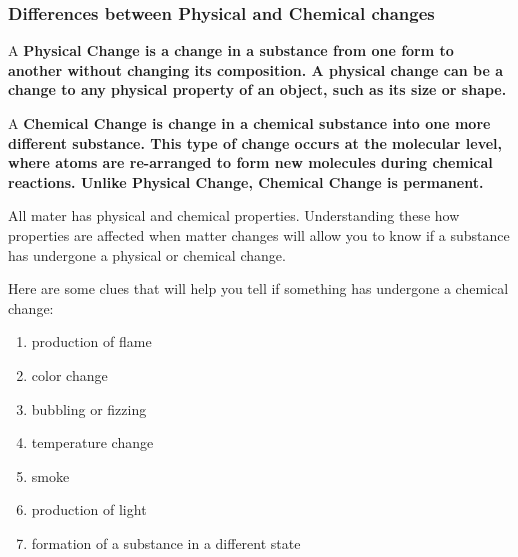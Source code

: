 
\subsubsection*{Differences between Physical and Chemical changes}

\begin{definition}
    A \bf{Physical Change} is a change in a substance from one form to
    another without changing its composition. A physical change can be a change
    to any physical property of an object, such as its size or shape.
\end{definition}

\begin{definition}
    A \bf{Chemical Change} is change in a chemical substance into one more
    different substance. This type of change occurs at the molecular level, where
    atoms are re-arranged to form new molecules during chemical reactions. Unlike
    \bf{Physical Change}, \bf{Chemical Change} is permanent.
\end{definition}

All mater has physical and chemical properties. Understanding these how
properties are affected when matter changes will allow you to know if a
substance has undergone a physical or chemical change.

Here are some clues that will help you tell if something has undergone a
chemical change:

\begin{enumerate}
    \item production of flame
    \item color change
    \item bubbling or fizzing
    \item temperature change
    \item smoke
    \item production of light
    \item formation of a substance in a different state
\end{enumerate}

\newpage
